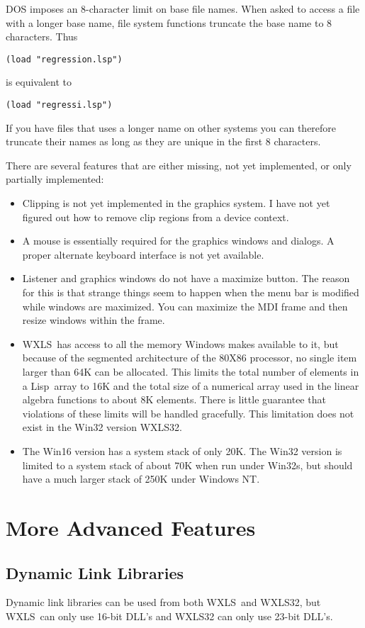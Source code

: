 \documentclass[11pt]{article}
\newcommand{\LS}{Lisp}
\newcommand{\WXLS}{WXLS}
\begin{document}
DOS imposes an 8-character limit on base file names. When asked to
access a file with a longer base name, file system functions truncate
the base name to 8 characters. Thus
\begin{verbatim}
(load "regression.lsp")
\end{verbatim}
is equivalent to
\begin{verbatim}
(load "regressi.lsp")
\end{verbatim}
If you have files that uses a longer name on other systems you can
therefore truncate their names as long as they are unique in the first
8 characters.

There are several features that are either missing, not yet
implemented, or only partially implemented:
\begin{itemize}
\item Clipping is not yet implemented in the graphics system. I have
  not yet figured out how to remove clip regions from a device
  context.
\item A mouse is essentially required for the graphics windows and
  dialogs.  A proper alternate keyboard interface is not yet
  available.
\item Listener and graphics windows do not have a maximize button. The
  reason for this is that strange things seem to happen when the menu
  bar is modified while windows are maximized.  You can maximize the
  MDI frame and then resize windows within the frame.
\item \WXLS\ has access to all the memory Windows makes available to
  it, but because of the segmented architecture of the 80X86
  processor, no single item larger than 64K can be allocated. This
  limits the total number of elements in a \LS\ array to 16K and the
  total size of a numerical array used in the linear algebra functions
  to about 8K elements. There is little guarantee that violations of
  these limits will be handled gracefully. This limitation does not exist
  in the Win32 version \WXLS32.
\item The Win16 version has a system stack of only 20K. The Win32 version is
  limited to a system stack of about 70K when run under Win32s, but should
  have a much larger stack of 250K under Windows NT.
\end{itemize}

\section{More Advanced Features}
\subsection{Dynamic Link Libraries}
Dynamic link libraries can be used from both \WXLS\ and \WXLS32, but
\WXLS\ can only use 16-bit DLL's and \WXLS32 can only use 23-bit
DLL's.
\end{document}
